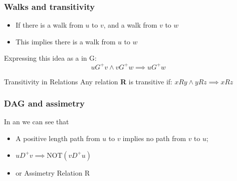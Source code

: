 \documentclass{beamer}
\begin{document}
\begin{frame}
  \frametitle{Walks and transitivity}

  {\larger

    \begin{itemize}
    \item If there is a walk from $u$ to $v$, and a walk from $v$ to $w$
    \item This implies there is a walk from $u$ to $w$
    \end{itemize}
    \begin{center}
    \end{center}
    Expressing this idea as a  in G:
    \begin{equation}
      uG^+v \land vG^+w \implies uG^+w
    \end{equation}

    \vfill
    \begin{block}{Transitivity in Relations}
      Any relation {\bf R} is transitive if:
      $xRy \land yRz \implies xRz$
    \end{block}
  }
\end{frame}

\begin{frame}
  \frametitle{DAG and assimetry}

  {\larger

    In an  we can see that
    \begin{itemize}
    \item A positive length path from $u$ to $v$ implies no
      path from $v$ to $u$;

      \bigskip

    \item $uD^+v \implies \text{NOT}(vD^+u)$

      \bigskip

    \item {} or Assimetry Relation R
    \end{itemize}
  }
\end{frame}
\end{document}
